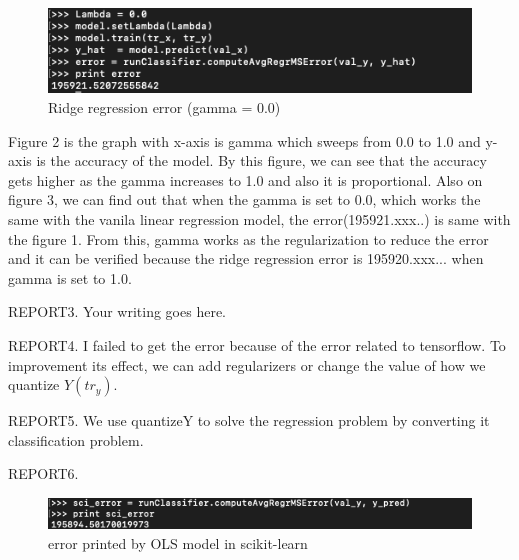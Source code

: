 \documentclass[a4 paper]{article}
\numberwithin{equation}{section}
\newcommand{\0}{\mathbf{0}}
\begin{document}
\begin{figure}
\begin{center}

\includegraphics[width=0.3\linewidth]{Ridge regression error when gamma is 0.png}

\end{center}

\caption{Ridge regression error (gamma = 0.0)}

\label{fig:long}

\label{fig:onecol}

\end{figure}

Figure 2 is the graph with x-axis is gamma which sweeps from 0.0 to 1.0 and y-axis is the accuracy of the model. By this figure, we can see that the accuracy gets higher as the gamma increases to 1.0 and also it is proportional.
Also on figure 3, we can find out that when the gamma is set to 0.0, which works the same with the vanila linear regression model, the error(195921.xxx..) is same with the figure 1. From this, gamma works as the regularization to reduce the error and it can be verified because the ridge regression error is 195920.xxx... when gamma is set to 1.0.

REPORT3. Your writing goes here.

REPORT4. I failed to get the error because of the error related to tensorflow.
To improvement its effect, we can add regularizers or change the value of how we quantize $Y(tr_y)$.

REPORT5. We use quantizeY to solve the regression problem by converting it classification problem.

REPORT6. 
\begin{figure}[h] 

\begin{center}

\includegraphics[width=1.0\linewidth]{OLS model in scikit-learn.png}

\end{center}

\caption{error printed by OLS model in scikit-learn }

\label{fig:long}

\label{fig:onecol}

\end{figure}
\end{document}
